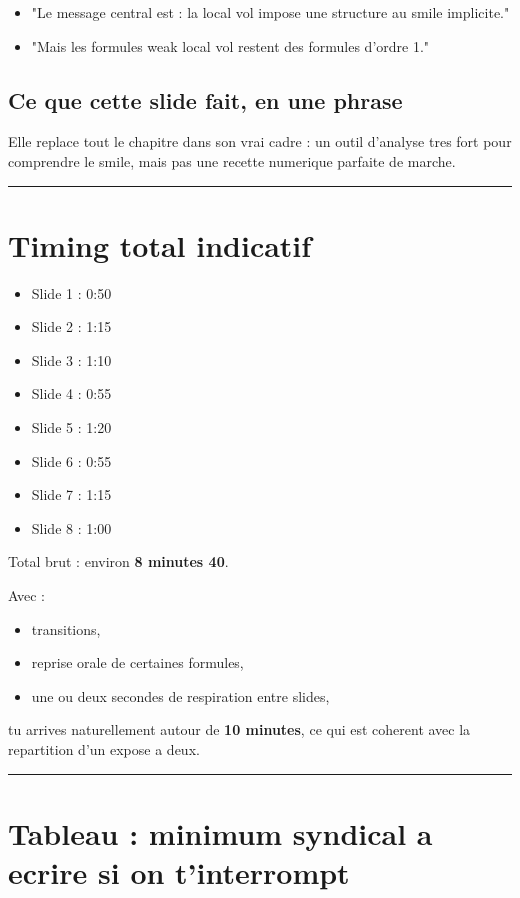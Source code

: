 \documentclass[11pt,a4paper]{article}
\begin{document}
\begin{itemize}
\item "Le message central est : la local vol impose une structure au smile implicite."
\item "Mais les formules weak local vol restent des formules d'ordre 1."
\end{itemize}

\subsection{Ce que cette slide fait, en une phrase}

Elle replace tout le chapitre dans son vrai cadre : un outil d'analyse tres fort pour comprendre le smile, mais pas une recette numerique parfaite de marche.

\bigskip\hrule\bigskip

\section{Timing total indicatif}

\begin{itemize}
\item Slide 1 : 0:50
\item Slide 2 : 1:15
\item Slide 3 : 1:10
\item Slide 4 : 0:55
\item Slide 5 : 1:20
\item Slide 6 : 0:55
\item Slide 7 : 1:15
\item Slide 8 : 1:00
\end{itemize}

Total brut : environ \textbf{8 minutes 40}.

Avec :
\begin{itemize}
\item transitions,
\item reprise orale de certaines formules,
\item une ou deux secondes de respiration entre slides,
\end{itemize}

tu arrives naturellement autour de \textbf{10 minutes}, ce qui est coherent avec la repartition d'un expose a deux.

\bigskip\hrule\bigskip

\section{Tableau : minimum syndical a ecrire si on t'interrompt}
\end{document}
